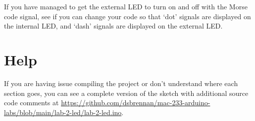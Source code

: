 \documentclass[11pt,a4paper]{article}
\begin{document}
\noindent
If you have managed to get the external LED to turn on and off with the Morse code signal, see if you can change your code so that `dot' signals are displayed on the internal LED, and `dash' signals are displayed on the external LED.

\newpage
\section*{Help}
If you are having issue compiling the project or don't understand where each section goes, you can see a complete version of the sketch with additional source code comments at \url{https://github.com/dsbrennan/mac-233-arduino-labs/blob/main/lab-2-led/lab-2-led.ino}.

\vspace{2em}

\begin{center}
\end{center}
\end{document}
